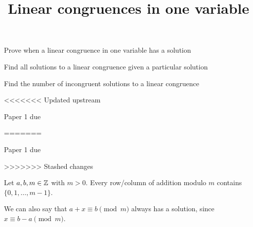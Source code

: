 \documentclass{ximera}
\title{Linear congruences in one variable}
\begin{document}
\begin{abstract}
\end{abstract}
\maketitle

\begin{obj}
	\item Prove when a linear congruence in one variable has a solution
	\item Find all solutions to a linear congruence given a particular solution
	\item Find the number of incongruent solutions to a linear congruence
\end{obj}

<<<<<<< Updated upstream
\begin{instructorNotes}
	\begin{pre} \item Paper 1 due
	\end{pre}
\end{instructorNotes}
=======

	\begin{pre} 
        \item Paper 1 due
	\end{pre}

>>>>>>> Stashed changes



\begin{remark}\label{rem:add-inverse}
	Let $a,b,m\in\mathbb Z$ with $m>0$. Every row/column of addition modulo $m$ contains $\{0,1,\dots,m-1\}$. 

	We can also say that $a+x\equiv b\pmod m$ always has a solution, since $x\equiv b-a\pmod m$.
\end{remark}
\end{document}
